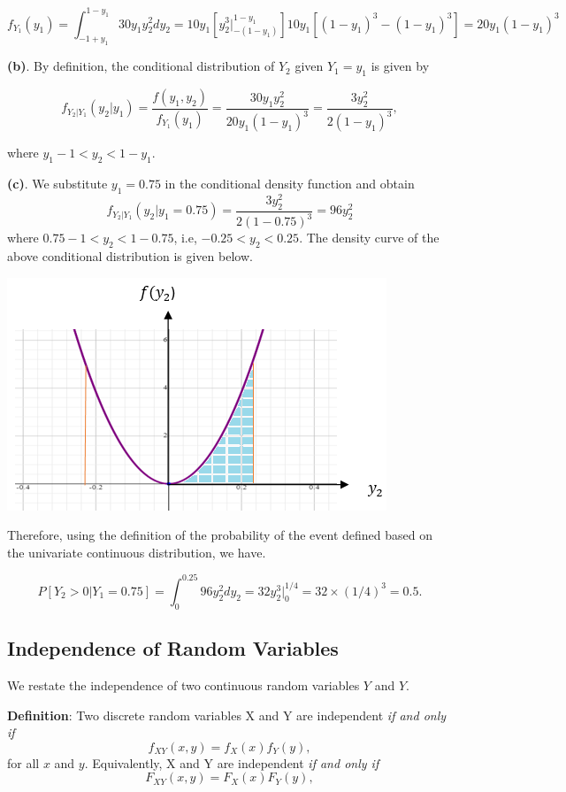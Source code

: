 \documentclass[
]{book}
\begin{document}
\[
f_{Y_1}(y_1) = \int_{-1+y_1}^{1-y_1}30y_1y_2^2dy_2 =10y_1\left[y_2^3\Big|_{-(1-y_1)}^{1-y_1}\right]10y_1\left[ (1-y_1)^3 -(1-y_1)^3\right]=20y_1(1-y_1)^3
\]

\hfill\break

\textbf{(b)}. By definition, the conditional distribution of \(Y_2\) given \(Y_1=y_1\) is given by

\[
f_{Y_2|Y_1}(y_2|y_1) = \frac{f(y_1,y_2)}{f_{Y_1}(y_1)} = \frac{30y_1y_2^2}{20y_1(1-y_1)^3} = \frac{3y_2^2}{2(1-y_1)^3},
\]

where \(y_1 -1 < y_2 < 1 - y_1.\)

\hfill\break

\textbf{(c)}. We substitute \(y_1 = 0.75\) in the conditional density function and obtain
\[
f_{Y_2|Y_1}(y_2|y_1=0.75) =\frac{3y_2^2}{2(1-0.75)^3}=96y_2^2
\]
where \(0.75-1 < y_2 < 1-0.75\), i.e, \(-0.25 < y_2 < 0.25\). The density curve of the above conditional distribution is given below.

\begin{center}\includegraphics[width=0.55\linewidth]{topic07/example09CondProb} \end{center}

Therefore, using the definition of the probability of the event defined based on the univariate continuous distribution, we have.

\[
P[Y_2 > 0|Y_1 = 0.75] = \int_0^{0.25}96y_2^2dy_2 = 32y_2^3\Big|_0^{1/4} = 32\times(1/4)^3 = 0.5.
\]

\hfill\break

\hypertarget{independence-of-random-variables}{%
\subsection{Independence of Random Variables}\label{independence-of-random-variables}}

We restate the independence of two continuous random variables \(Y\) and \(Y\).

\textbf{Definition}: Two discrete random variables X and Y are independent \emph{if and only if}
\[
f_{XY}(x,y)=f_X(x)f_Y(y), 
\]
for all \(x\) and \(y\). Equivalently, X and Y are independent \emph{if and only if}
\[
F_{XY}(x,y)=F_X(x)F_Y(y), 
\]
\end{document}
